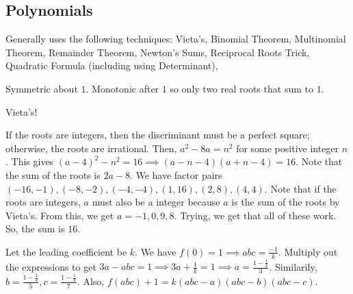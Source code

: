 \documentclass[11pt]{article}
\begin{document}
\subsection{Polynomials}
Generally uses the following techniques: Vieta's, Binomial Theorem, Multinomial Theorem, Remainder Theorem, Newton's Sums, Reciprocal Roots Trick, Quadratic Formula (including using Determinant), 





\sol Symmetric about $1$. Monotonic after $1$ so only two real roots that sum to $1$.


\sol Vieta's! 


\sol If the roots are integers, then the discriminant must be a perfect square; otherwise, the roots are irrational. Then, $a^2-8a=n^2$ for some positive integer $n$. This gives $(a-4)^2-n^2=16\implies (a-n-4)(a+n-4)=16$. Note that the sum of the roots is $2a-8$. We have factor pairs $(-16,-1),(-8,-2),(-4,-4),(1,16),(2,8),(4,4)$. Note that if the roots are integers, $a$ must also be a integer because $a$ is the sum of the roots by Vieta's. From this, we get $a=-1, 0, 9, 8$. Trying, we get that all of these work. So, the sum is $\boxed{16}$.


\sol  Let the leading coefficient be $k$. We have $f(0)=1\implies abc=\frac{-1}{k}$. Multiply out the expressions to get $3a-abc=1\implies 3a+\frac{1}{k}=1\implies a = \frac{1-\frac{1}{k}}{3}$. Similarily, $b=\frac{1-\frac{1}{k}}{5}, c= \frac{1-\frac{1}{k}}{7}$.  Also, $f(abc)+1=k(abc-a)(abc-b)(abc-c)$.
\end{document}
